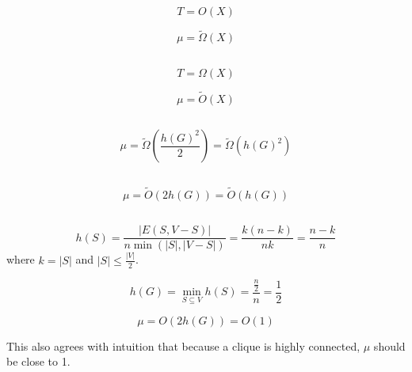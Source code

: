 \documentclass[a4paper,11pt,oneside,onecolumn]{article}
\begin{document}
\section{}

\section{}

\subsection{}

$$
T = O(X)
$$

$$
\mu = \tilde\Omega(X)
$$

\subsection{}

$$
T = \Omega(X)
$$

$$
\mu = \tilde O(X)
$$

\subsection{}

$$
\mu = \tilde\Omega\left(\frac{h(G)^2}{2}\right) = \tilde\Omega\left(h(G)^2\right)
$$

\subsection{}

$$
\mu = \tilde O\left(2 h(G) \right) = \tilde O\left( h(G) \right)
$$

\subsection{}

\subsubsection{}

$$
h(S) = \frac{|E(S,V-S)|}{n \min\left(|S|,|V-S|\right)} = \frac{k(n-k)}{nk} = \frac{n-k}{n}
$$
where $k = |S|$ and $|S| \le \frac{|V|}{2}$.

$$
h(G) = \min_{S\subseteq V} h(S) = \frac{\frac{n}{2}}{n} = \frac{1}{2}
$$

$$
\mu = O\left(2 h(G) \right) = O \left(1\right)
$$

This also agrees with intuition that because a clique is highly connected, $\mu$ should be close to 1.

\section{}

\section{}
\end{document}
